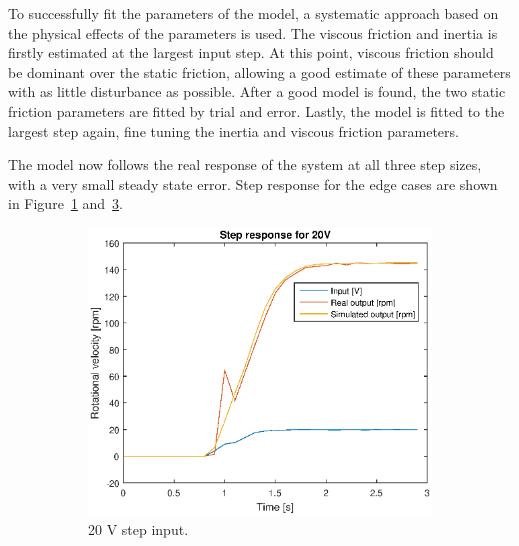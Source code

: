 To successfully fit the parameters of the model, a systematic approach based on
the physical effects of the parameters is used. The viscous friction and inertia 
is firstly estimated at the largest input step. At this point, viscous friction
should be dominant over the static friction, allowing a good estimate of these
parameters with as little disturbance as possible. After a good model is found,
the two static friction parameters are fitted by trial and error. Lastly, the
model is fitted to the largest step again, fine tuning the inertia and viscous
friction parameters.

The model now follows the real response of the system at all three step sizes,
with a very small steady state error. Step response for the edge cases are shown
in Figure~\ref{fig:20vkarnop} and~\ref{fig:5vkarnop}.
\begin{figure}[H]
    \centering
    \begin{subfigure}[H]{0.48\textwidth}
    \label{fig:20vkarnop}
    \includegraphics[width=\textwidth]{./img/testrig_20Vstep_no_i_fric.eps}
    \caption{20 V step input.}
    \end{subfigure}
    \begin{subfigure}[H]{0.48\textwidth}
    \label{fig:5vkarnop}

\end{subfigure}
\end{figure}
